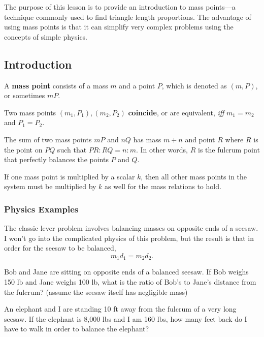 The purpose of this lesson is to provide an introduction to mass points---a technique commonly used to find triangle length proportions. The advantage of using mass points is that it can simplify very complex problems using the concepts of simple physics.

\subsection{Introduction}
    \begin{definition}
    A \textbf{mass point} consists of a mass $m$ and a point $P$, which is denoted as $(m,P)$, or sometimes $mP$.
    \end{definition}
    \begin{definition}
    Two mass points $(m_1,P_1), (m_2, P_2)$ \textbf{coincide}, or are equivalent, \textit{iff} $m_1=m_2$ and $P_1=P_2$.
    \end{definition}
    \begin{definition} The sum of two mass points $mP$ and $nQ$ has mass $m + n$ and point $R$ where $R$ is the point on $PQ$ such that $PR:RQ = n:m$. In other words, $R$ is the fulcrum point that perfectly balances the points $P$ and $Q$.
    \end{definition}
	\begin{definition}
	If one mass point is multiplied by a scalar $k$, then all other mass points in the system must be multiplied by $k$ as well for the mass relations to hold.
    \end{definition}
	
	\subsubsection{Physics Examples}
	The classic lever problem involves balancing masses on opposite ends of a seesaw. I won't go into the complicated physics of this problem, but the result is that in order for the seesaw to be balanced, 
	$$m_1 d_1 = m_2 d_2.$$
\begin{problem}
    Bob and Jane are sitting on opposite ends of a balanced seesaw. If Bob weighs 150 lb and Jane weighs 100 lb, what is the ratio of Bob's to Jane's distance from the fulcrum? (assume the seesaw itself has negligible mass)
\end{problem}
\begin{problem}
    An elephant and I are standing 10 ft away from the fulcrum of a very long seesaw. If the elephant is 8,000 lbs and I am 160 lbs, how many feet back do I have to walk in order to balance the elephant?
\end{problem}
    
